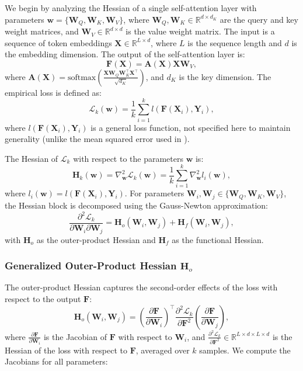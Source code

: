 \documentclass{article}
\begin{document}
We begin by analyzing the Hessian of a single self-attention layer with parameters \(\mathbf{w} = \{\mathbf{W}_Q, \mathbf{W}_K, \mathbf{W}_V\}\), where \(\mathbf{W}_Q, \mathbf{W}_K \in \mathbb{R}^{d \times d_K}\) are the query and key weight matrices, and \(\mathbf{W}_V \in \mathbb{R}^{d \times d}\) is the value weight matrix. The input is a sequence of token embeddings \(\mathbf{X} \in \mathbb{R}^{L \times d}\), where \(L\) is the sequence length and \(d\) is the embedding dimension. The output of the self-attention layer is:
\[
\mathbf{F}(\mathbf{X}) = \mathbf{A}(\mathbf{X}) \mathbf{X} \mathbf{W}_V,
\]
where \(\mathbf{A}(\mathbf{X}) = \text{softmax}\left( \frac{\mathbf{X} \mathbf{W}_Q \mathbf{W}_K^\top \mathbf{X}^\top}{\sqrt{d_K}} \right)\), and \(d_K\) is the key dimension. The empirical loss is defined as:
\[
\mathcal{L}_k(\mathbf{w}) = \frac{1}{k} \sum_{i=1}^k l(\mathbf{F}(\mathbf{X}_i), \mathbf{Y}_i),
\]
where \(l(\mathbf{F}(\mathbf{X}_i), \mathbf{Y}_i)\) is a general loss function, not specified here to maintain generality (unlike the mean squared error used in \cite{ormaniec2024attentionhessian}).

The Hessian of \(\mathcal{L}_k\) with respect to the parameters \(\mathbf{w}\) is:
\[
\mathbf{H}_k(\mathbf{w}) = \nabla^2_{\mathbf{w}} \mathcal{L}_k(\mathbf{w}) = \frac{1}{k} \sum_{i=1}^k \nabla^2_{\mathbf{w}} l_i(\mathbf{w}),
\]
where \(l_i(\mathbf{w}) = l(\mathbf{F}(\mathbf{X}_i), \mathbf{Y}_i)\). For parameters \(\mathbf{W}_i, \mathbf{W}_j \in \{\mathbf{W}_Q, \mathbf{W}_K, \mathbf{W}_V\}\), the Hessian block is decomposed using the Gauss-Newton approximation:
\[
\frac{\partial^2 \mathcal{L}_k}{\partial \mathbf{W}_i \partial \mathbf{W}_j} = \mathbf{H}_o(\mathbf{W}_i, \mathbf{W}_j) + \mathbf{H}_f(\mathbf{W}_i, \mathbf{W}_j),
\]
with \(\mathbf{H}_o\) as the outer-product Hessian and \(\mathbf{H}_f\) as the functional Hessian.

\subsubsection{Generalized Outer-Product Hessian \( \mathbf{H}_o \)}
The outer-product Hessian captures the second-order effects of the loss with respect to the output \(\mathbf{F}\):
\[
\mathbf{H}_o(\mathbf{W}_i, \mathbf{W}_j) = \left( \frac{\partial \mathbf{F}}{\partial \mathbf{W}_i} \right)^\top \frac{\partial^2 \mathcal{L}_k}{\partial \mathbf{F}^2} \left( \frac{\partial \mathbf{F}}{\partial \mathbf{W}_j} \right),
\]
where \(\frac{\partial \mathbf{F}}{\partial \mathbf{W}_i}\) is the Jacobian of \(\mathbf{F}\) with respect to \(\mathbf{W}_i\), and \(\frac{\partial^2 \mathcal{L}_k}{\partial \mathbf{F}^2} \in \mathbb{R}^{L \times d \times L \times d}\) is the Hessian of the loss with respect to \(\mathbf{F}\), averaged over \(k\) samples. We compute the Jacobians for all parameters:
\end{document}
